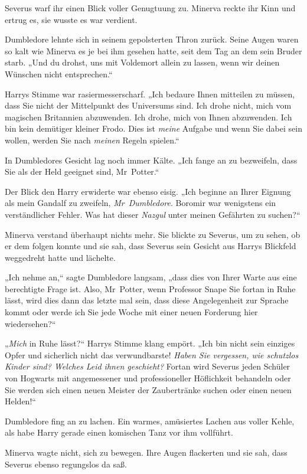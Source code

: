 {Severus warf ihr einen Blick voller Genugtuung zu. Minerva reckte ihr Kinn und ertrug es, sie wusste es war verdient.

Dumbledore lehnte sich in seinem gepolsterten Thron zurück. Seine Augen waren so kalt wie Minerva es je bei ihm gesehen hatte, seit dem Tag an dem sein Bruder starb. „Und du drohst, uns mit Voldemort allein zu lassen, wenn wir deinen Wünschen nicht entsprechen.“

Harrys Stimme war rasiermesserscharf. „Ich bedaure Ihnen mitteilen zu müssen, dass Sie nicht der Mittelpunkt des Universums sind. Ich drohe nicht, mich vom magischen Britannien abzuwenden. Ich drohe, mich von Ihnen abzuwenden. Ich bin kein demütiger kleiner Frodo. Dies ist \emph{meine} Aufgabe und wenn Sie dabei sein wollen, werden Sie nach \emph{meinen} Regeln spielen.“

In Dumbledores Gesicht lag noch immer Kälte. „Ich fange an zu bezweifeln, dass Sie als der Held geeignet sind, Mr~Potter.“

Der Blick den Harry erwiderte war ebenso eisig. „Ich beginne an Ihrer Eignung als mein Gandalf zu zweifeln, \emph{Mr~Dumbledore}. Boromir war wenigstens ein verständlicher Fehler. Was hat dieser \emph{Nazgul} unter meinen Gefährten zu suchen?“

Minerva verstand überhaupt nichts mehr. Sie blickte zu Severus, um zu sehen, ob er dem folgen konnte und sie sah, dass Severus sein Gesicht aus Harrys Blickfeld weggedreht hatte und lächelte.

„Ich nehme an,“ sagte Dumbledore langsam, „dass dies von Ihrer Warte aus eine berechtigte Frage ist. Also, Mr~Potter, wenn Professor Snape Sie fortan in Ruhe lässt, wird dies dann das letzte mal sein, dass diese Angelegenheit zur Sprache kommt oder werde ich Sie jede Woche mit einer neuen Forderung hier wiedersehen?“

„\emph{Mich} in Ruhe lässt?“ Harrys Stimme klang empört. „Ich bin nicht sein einziges Opfer und sicherlich nicht das verwundbarste! \emph{Haben Sie vergessen, wie schutzlos Kinder sind? Welches Leid ihnen geschieht?} Fortan wird Severus jeden Schüler von Hogwarts mit angemessener und professioneller Höflichkeit behandeln oder Sie werden sich einen neuen Meister der Zaubertränke suchen oder einen neuen Helden!“

Dumbledore fing an zu lachen. Ein warmes, amüsiertes Lachen aus voller Kehle, als habe Harry gerade einen komischen Tanz vor ihm vollführt.

Minerva wagte nicht, sich zu bewegen. Ihre Augen flackerten und sie sah, dass Severus ebenso regungslos da saß.

}
